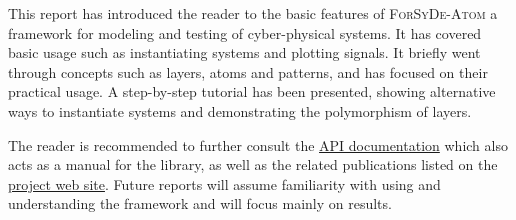 This report has introduced the reader to the basic features of \textsc{ForSyDe-Atom} a framework for modeling and testing of cyber-physical systems. It has covered basic usage such as instantiating systems and plotting signals. It briefly went through concepts such as layers, atoms and patterns, and has focused on their practical usage. A step-by-step tutorial has been presented, showing alternative ways to instantiate systems and demonstrating the polymorphism of layers.

The reader is recommended to further consult the \href{\contentsurl}{API documentation} which also acts as a manual for the library, as well as the related publications listed on the \href{https://github.com/forsyde/forsyde-atom}{project web site}. Future reports will assume familiarity with using and understanding the framework and will focus mainly on results. 

